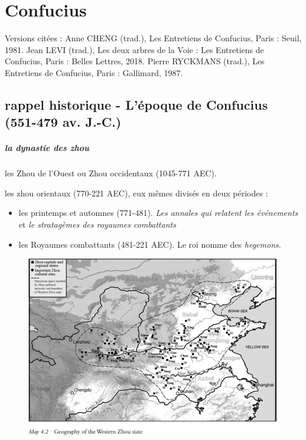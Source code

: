 \chapter{Confucius}  

Versions citées : Anne CHENG (trad.), Les Entretiens de Confucius, Paris : Seuil, 1981.  Jean LEVI (trad.), Les deux arbres de la Voie : Les Entretiens de Confucius, Paris : Belles Lettres, 2018.   Pierre RYCKMANS (trad.), Les Entretiens de Confucius, Paris : Gallimard, 1987.  

\section{rappel historique - L’époque de Confucius (551-479 av. J.-C.)}

\paragraph{la dynastie des zhou}
 
les Zhou de l’Ouest ou Zhou occidentaux (1045-771 AEC).
 
 
les zhou orientaux (770-221 AEC), eux mêmes divisés en deux périodes : 
\begin{itemize}
    \item les printemps et automnes (771-481). \textit{Les annales qui relatent les événements} et \textit{le stratagèmes des royaumes combattants}
    \item les Royaumes combattants (481-221 AEC). Le roi nomme des \textit{hegemons}. 
\end{itemize}
\begin{figure}[!h]
    \centering
    \includegraphics[width=\textwidth]{ConfucianismeTaoismeBouddhismeChinois/Images/zhouville.png}

    \label{fig:enter-label}
\end{figure}

